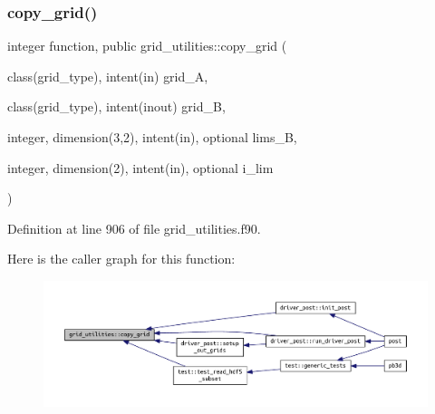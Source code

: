 \subsubsection{\texorpdfstring{copy\+\_\+grid()}{copy\_grid()}}
{\footnotesize\ttfamily integer function, public grid\+\_\+utilities\+::copy\+\_\+grid (\begin{DoxyParamCaption}\item[{class(grid\+\_\+type), intent(in)}]{grid\+\_\+A,  }\item[{class(grid\+\_\+type), intent(inout)}]{grid\+\_\+B,  }\item[{integer, dimension(3,2), intent(in), optional}]{lims\+\_\+B,  }\item[{integer, dimension(2), intent(in), optional}]{i\+\_\+lim }\end{DoxyParamCaption})}



Definition at line 906 of file grid\+\_\+utilities.\+f90.

Here is the caller graph for this function\+:
\nopagebreak
\begin{figure}[H]
\begin{center}
\leavevmode
\includegraphics[width=350pt]{namespacegrid__utilities_a04f971c38083f873a04eb6568bed466b_icgraph}
\end{center}
\end{figure}
\mbox{\label{namespacegrid__utilities_a414a1a11924bc935afca3a89fc31f2f5}} 
